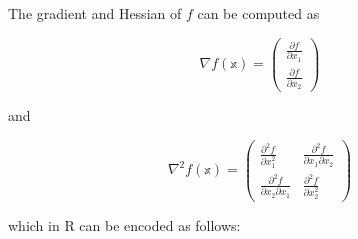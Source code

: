\documentclass[
]{book}
\begin{document}
The gradient and Hessian of \(f\) can be computed as

\[
\begin{equation}
\nabla f(\mathbb{x})= \begin{pmatrix}
\frac{ \partial f}{\partial x_1} \\
\frac{ \partial f}{\partial x_2}
\end{pmatrix} 
\label{eq:d-rosenbrock}
\end{equation}
\]

and

\[
\begin{equation}
\nabla^2 f(\mathbb{x})= \begin{pmatrix}
\frac{ \partial^2 f}{\partial x_1^2} & \frac{ \partial^2 f}{\partial x_1 \partial x_2} \\
\frac{ \partial^2 f}{\partial x_2\partial x_1} & \frac{ \partial^2 f}{\partial x_2^2}
\end{pmatrix}
\label{eq:dd-rosenbrock}
\end{equation}
\]

which in R can be encoded as follows:
\end{document}
